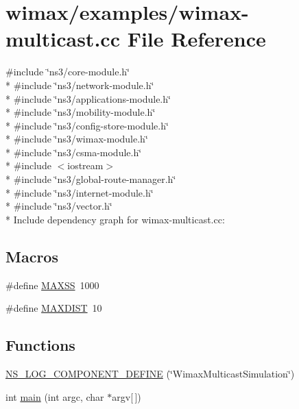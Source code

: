 \hypertarget{wimax-multicast_8cc}{}\section{wimax/examples/wimax-\/multicast.cc File Reference}
\label{wimax-multicast_8cc}
{\ttfamily \#include \char`\"{}ns3/core-\/module.\+h\char`\"{}}\\*
{\ttfamily \#include \char`\"{}ns3/network-\/module.\+h\char`\"{}}\\*
{\ttfamily \#include \char`\"{}ns3/applications-\/module.\+h\char`\"{}}\\*
{\ttfamily \#include \char`\"{}ns3/mobility-\/module.\+h\char`\"{}}\\*
{\ttfamily \#include \char`\"{}ns3/config-\/store-\/module.\+h\char`\"{}}\\*
{\ttfamily \#include \char`\"{}ns3/wimax-\/module.\+h\char`\"{}}\\*
{\ttfamily \#include \char`\"{}ns3/csma-\/module.\+h\char`\"{}}\\*
{\ttfamily \#include $<$iostream$>$}\\*
{\ttfamily \#include \char`\"{}ns3/global-\/route-\/manager.\+h\char`\"{}}\\*
{\ttfamily \#include \char`\"{}ns3/internet-\/module.\+h\char`\"{}}\\*
{\ttfamily \#include \char`\"{}ns3/vector.\+h\char`\"{}}\\*
Include dependency graph for wimax-\/multicast.cc\+:
\subsection*{Macros}
\begin{DoxyCompactItemize}
\item 
\#define \hyperlink{wimax-multicast_8cc_a70d6b107a3aed69eb4a4b5d94cfc81cb}{M\+A\+X\+SS}~1000
\item 
\#define \hyperlink{wimax-multicast_8cc_ad20257241c97c3e731b64608dcdc5096}{M\+A\+X\+D\+I\+ST}~10
\end{DoxyCompactItemize}
\subsection*{Functions}
\begin{DoxyCompactItemize}
\item 
\hyperlink{wimax-multicast_8cc_a25d9464217f7d545ec3344fb08d615e7}{N\+S\+\_\+\+L\+O\+G\+\_\+\+C\+O\+M\+P\+O\+N\+E\+N\+T\+\_\+\+D\+E\+F\+I\+NE} (\char`\"{}Wimax\+Multicast\+Simulation\char`\"{})
\item 
int \hyperlink{wimax-multicast_8cc_a0ddf1224851353fc92bfbff6f499fa97}{main} (int argc, char $\ast$argv\mbox{[}$\,$\mbox{]})
\end{DoxyCompactItemize}


